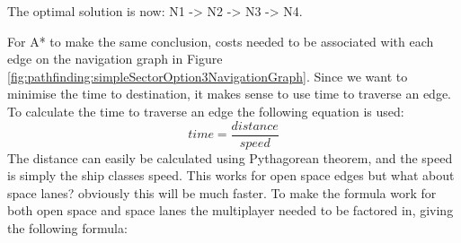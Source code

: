 The optimal solution is now: N1 -> N2 -> N3 -> N4.

For A* to make the same conclusion, costs needed to be associated with each edge on the navigation graph in Figure \ref{fig:pathfinding:simpleSectorOption3NavigationGraph}.
Since we want to minimise the time to destination, it makes sense to use time to traverse an edge.
To calculate the time to traverse an edge the following equation is used:
$$ time = \frac{distance}{speed} $$
The distance can easily be calculated using Pythagorean theorem, and the speed is simply the ship classes speed.
This works for open space edges but what about space lanes? obviously this will be much faster.
To make the formula work for both open space and space lanes the multiplayer needed to be factored in, giving the following formula:






